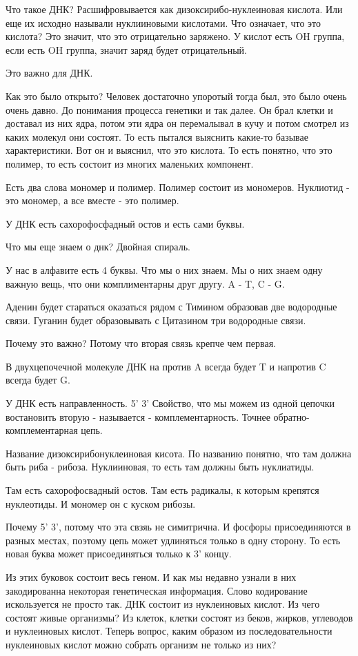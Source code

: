 Что такое ДНК? Расшифровывается как
дизоксирибо-нуклеиновая кислота. Или еще 
их исходно называли нуклииновыми кислотами. Что означает, что 
это кислота? Это значит, что это отрицательно заряжено. У кислот есть 
OH группа, если есть OH группа, значит заряд будет отрицательный.

Это важно для ДНК.

Как это было открыто? Человек достаточно упоротый тогда был, это было очень очень давно.
До понимания процесса генетики и так далее. Он брал клетки и доставал из
них ядра, потом эти ядра он перемалывал в кучу и потом
смотрел из каких молекул они состоят. То есть пытался выяснить какие-то
базывае характеристики. Вот он и выяснил, что это кислота. То есть понятно,
что это полимер, то есть состоит из многих маленьких компонент.

Есть два слова мономер и полимер. Полимер состоит из мономеров. 
Нуклиотид - это мономер, а все вместе - это полимер.

У ДНК есть сахорофосфадный остов и есть сами буквы.

Что мы еще знаем о днк? Двойная спираль. 

У нас в алфавите есть 4 буквы. Что мы о них знаем. Мы о них знаем одну важную вещь,
что они комплиментарны друг другу. A - T, C - G.

Аденин будет стараться оказаться рядом с Тимином образовав две водородные
связи. Гуганин будет образовывать с Цитазином три водородные связи.

Почему это важно? Потому что вторая связь крепче чем первая.

В двухцепочечной молекуле ДНК на против A всегда будет T и
напротив C всегда будет G.

У ДНК есть направленность. 5' 3' Свойство, что
мы можем из одной цепочки востановить вторую - называется - комплементарность.
Точнее обратно-комплементарная цепь. 

Название дизоксирибонуклеиновая кисота. По названию понятно, что там 
должна быть риба - рибоза. Нуклииновая, то есть там должны быть нуклиатиды. 

Там есть сахорофосвадный остов. Там есть радикалы, к которым крепятся 
нуклеотиды. И мономер он с куском рибозы. 

Почему 5' 3', потому что эта свзяь не симитрична. И фосфоры присоединяются в разных 
местах, поэтому цепь может удлиняться только в одну сторону. То есть новая буква 
может присоединяться только к 3' концу.

Из этих буковок состоит весь геном. И как мы недавно узнали в них
закодированна некоторая генетическая информация. Слово кодирование искользуется
не просто так. ДНК состоит из нуклеиновых кислот. Из чего состоят живые организмы?
Из клеток, клетки состоят из беков, жирков, углеводов и нуклеиновых кислот. Теперь вопрос,
каким образом из последовательности
нуклеиновых кислот можно собрать организм не только из них?

